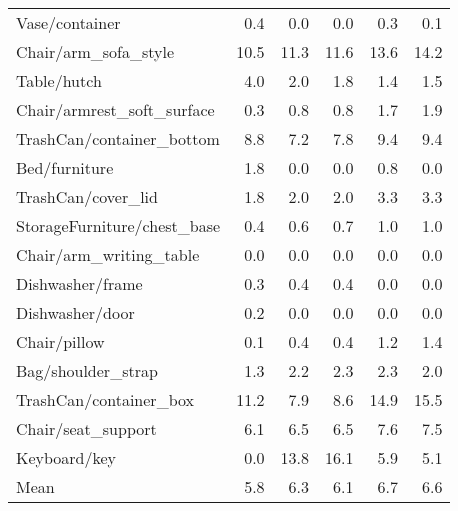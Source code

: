\begin{table}[!h]
\begin{tabular}{lrrrrr}
Vase/container                 &            0.4 &             0.0 &                     0.0 &           0.3 &                   0.1 \\
Chair/arm\_sofa\_style           &           10.5 &            11.3 &                    11.6 &          13.6 &                  14.2 \\
Table/hutch                    &            4.0 &             2.0 &                     1.8 &           1.4 &                   1.5 \\
Chair/armrest\_soft\_surface     &            0.3 &             0.8 &                     0.8 &           1.7 &                   1.9 \\
TrashCan/container\_bottom      &            8.8 &             7.2 &                     7.8 &           9.4 &                   9.4 \\
Bed/furniture                  &            1.8 &             0.0 &                     0.0 &           0.8 &                   0.0 \\
TrashCan/cover\_lid             &            1.8 &             2.0 &                     2.0 &           3.3 &                   3.3 \\
StorageFurniture/chest\_base    &            0.4 &             0.6 &                     0.7 &           1.0 &                   1.0 \\
Chair/arm\_writing\_table        &            0.0 &             0.0 &                     0.0 &           0.0 &                   0.0 \\
Dishwasher/frame               &            0.3 &             0.4 &                     0.4 &           0.0 &                   0.0 \\
Dishwasher/door                &            0.2 &             0.0 &                     0.0 &           0.0 &                   0.0 \\
Chair/pillow                   &            0.1 &             0.4 &                     0.4 &           1.2 &                   1.4 \\
Bag/shoulder\_strap             &            1.3 &             2.2 &                     2.3 &           2.3 &                   2.0 \\
TrashCan/container\_box         &           11.2 &             7.9 &                     8.6 &          14.9 &                  15.5 \\
Chair/seat\_support             &            6.1 &             6.5 &                     6.5 &           7.6 &                   7.5 \\
Keyboard/key                   &            0.0 &            13.8 &                    16.1 &           5.9 &                   5.1 \\
\midrule
Mean                           &            5.8 &             6.3 &                     6.1 &           6.7 &                   6.6 \\
\bottomrule
\end{tabular}
\end{table}

